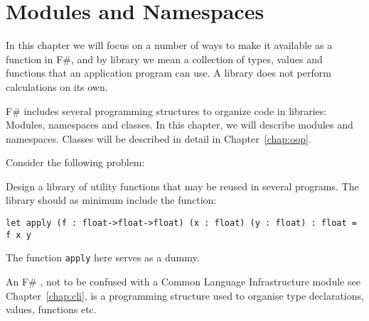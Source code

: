 \chapter{Modules and Namespaces}
\label{chap:modules}
In this chapter we will focus on a number of ways to make it available as a  function in F\#, and by library we mean a collection of types, values and functions that an application program can use. A library does not perform calculations on its own.

F\# includes several programming structures to organize code in libraries: Modules, namespaces and classes. In this chapter, we will describe modules and namespaces. Classes will be described in detail in Chapter~\ref{chap:oop}.

Consider the following problem:
\begin{problem}
  Design a library of utility functions that may be reused in several programs. The library should as minimum include the function:
\begin{lstlisting}[numbers=none]
let apply (f : float->float->float) (x : float) (y : float) : float = f x y
\end{lstlisting}
\end{problem}
The function \lstinline{apply} here serves as a dummy. 

An F\# , not to be confused with a Common Language Infrastructure module see Chapter~\ref{chap:cli}, is a programming structure used to organise type declarations, values, functions etc. 

